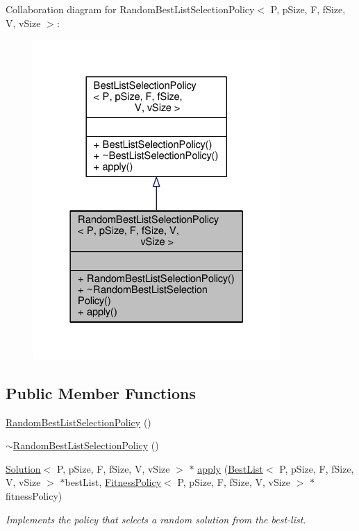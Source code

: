 Collaboration diagram for Random\+Best\+List\+Selection\+Policy$<$ P, p\+Size, F, f\+Size, V, v\+Size $>$\+:
\nopagebreak
\begin{figure}[H]
\begin{center}
\leavevmode
\includegraphics[width=266pt]{classRandomBestListSelectionPolicy__coll__graph}
\end{center}
\end{figure}
\subsection*{Public Member Functions}
\begin{DoxyCompactItemize}
\item 
\hyperlink{classRandomBestListSelectionPolicy_abc1f4bb2b43625f4161cf7adc3d9dec8}{Random\+Best\+List\+Selection\+Policy} ()
\item 
\hyperlink{classRandomBestListSelectionPolicy_a2c40baedbdd06e339632890367dfd5db}{$\sim$\+Random\+Best\+List\+Selection\+Policy} ()
\item 
\hyperlink{classSolution}{Solution}$<$ P, p\+Size, F, f\+Size, V, v\+Size $>$ $\ast$ \hyperlink{classRandomBestListSelectionPolicy_ae32f042697269d74c6fed4b9ff6771c8}{apply} (\hyperlink{classBestList}{Best\+List}$<$ P, p\+Size, F, f\+Size, V, v\+Size $>$ $\ast$best\+List, \hyperlink{classFitnessPolicy}{Fitness\+Policy}$<$ P, p\+Size, F, f\+Size, V, v\+Size $>$ $\ast$fitness\+Policy)
\begin{DoxyCompactList}\small\item\em Implements the policy that selects a random solution from the best-\/list. \end{DoxyCompactList}\end{DoxyCompactItemize}


